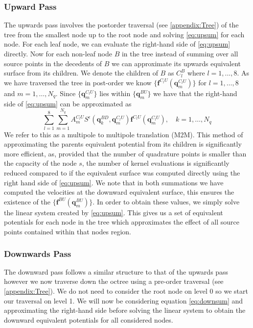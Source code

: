 \subsubsection{Upward Pass}
The upwards pass involves the postorder traversal (see \cref{appendix:Tree}) of the tree from the smallest node up to the root node and solving \cref{eq:upsum} for each node. For each leaf node, we can evaluate the right-hand side of \cref{eq:upsum} directly. Now for each non-leaf node $B$ in the tree instead of summing over all source points in the decedents of $B$ we can approximate its upwards equivalent surface from its children. We denote the children of $B$ as $C_l^B$ where $l=1,...,8$. As we have traversed the tree in post-order we know $\{\bm{f}^{C_l U}(\bm{q}^{C_lU}_m)\}$ for $l=1,\dots,8$ and $m=1,\dots,N_q$. Since $\{\bm{q}^{C_lU}_m\}$ lies within $\{\bm{q}^{BU}_m\}$ we have that the right-hand side of \cref{eq:upsum} can be approximated as
\begin{equation}
\label{eq:M2M}
    \sum_{l=1}^{8} \sum_{m=1}^{N_{q}} A_{m}^{C_{l} U} S^\epsilon\left(\bm{q}_{k}^{B D}, \bm{q}_{m}^{C_{l} U}\right) \bm{f}^{C_{l} U}\left(\bm{q}_{m}^{C_{l} U}\right), \quad k=1,\dots,N_q
\end{equation}
We refer to this as a multipole to multipole translation (M2M). This method of approximating the parents equivalent potential from its children is significantly more efficient, as, provided that the number of quadrature points is smaller than the capacity of the node $s$, the number of kernel evaluations is significantly reduced compared to if the equivalent surface was computed directly using the right hand side of \cref{eq:upsum}. We note that in both summations we have computed the velocities at the downward equivalent surface, this ensures the existence of the $\{\bm{f}^{BU}(\bm{q}^{BU}_m)\}$. In order to obtain these values, we simply solve the linear system created by \cref{eq:upsum}. This gives us a set of equivalent potentials for each node in the tree which approximates the effect of all source points contained within that nodes region.

\subsubsection{Downwards Pass}
The downward pass follows a similar structure to that of the upwards pass however we now traverse down the octree using a pre-order traversal (see \cref{appendix:Tree}). We do not need to consider the root node on level 0 so we start our traversal on level 1. We will now be considering equation \cref{eq:downsum} and approximating the right-hand side before solving the linear system to obtain the downward equivalent potentials for all considered nodes.

